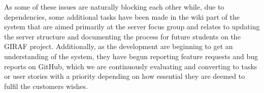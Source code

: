 \noindent
As some of these issues are naturally blocking each other while, due to dependencies, some additional tasks have been made in the wiki part of the system that are aimed primarily at the server focus group and relates to updating the server structure and documenting the process for future students on the GIRAF project.
Additionally, as the development are beginning to get an understanding of the system, they have begun reporting feature requests and bug reports on GitHub, which we are continuously evaluating and converting to tasks or user stories with a priority depending on how essential they are deemed to fulfil the customers wishes.